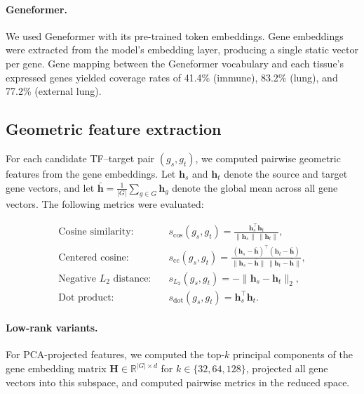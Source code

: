 \documentclass[11pt]{article}
\begin{document}
\paragraph{Geneformer.}
We used Geneformer \cite{theodoris2023transfer} with its pre-trained token embeddings.
Gene embeddings were extracted from the model's embedding layer, producing a single static vector per gene.
Gene mapping between the Geneformer vocabulary and each tissue's expressed genes yielded coverage rates of 41.4\% (immune), 83.2\% (lung), and 77.2\% (external lung).

\subsection*{Geometric feature extraction}

For each candidate TF--target pair $(g_s, g_t)$, we computed pairwise geometric features from the gene embeddings.
Let $\mathbf{h}_s$ and $\mathbf{h}_t$ denote the source and target gene vectors, and let $\bar{\mathbf{h}} = \frac{1}{|G|}\sum_{g \in G} \mathbf{h}_g$ denote the global mean across all gene vectors.
The following metrics were evaluated:

\begin{align}
\text{Cosine similarity:} \quad & s_{\cos}(g_s, g_t) = \frac{\mathbf{h}_s^\top \mathbf{h}_t}{\|\mathbf{h}_s\| \, \|\mathbf{h}_t\|}, \label{eq:cosine} \\[6pt]
\text{Centered cosine:} \quad & s_{\text{cc}}(g_s, g_t) = \frac{(\mathbf{h}_s - \bar{\mathbf{h}})^\top (\mathbf{h}_t - \bar{\mathbf{h}})}{\|\mathbf{h}_s - \bar{\mathbf{h}}\| \, \|\mathbf{h}_t - \bar{\mathbf{h}}\|}, \label{eq:centered_cosine} \\[6pt]
\text{Negative $L_2$ distance:} \quad & s_{L_2}(g_s, g_t) = -\|\mathbf{h}_s - \mathbf{h}_t\|_2, \label{eq:neg_l2} \\[6pt]
\text{Dot product:} \quad & s_{\text{dot}}(g_s, g_t) = \mathbf{h}_s^\top \mathbf{h}_t. \label{eq:dot}
\end{align}

\paragraph{Low-rank variants.}
For PCA-projected features, we computed the top-$k$ principal components of the gene embedding matrix $\mathbf{H} \in \mathbb{R}^{|G| \times d}$ for $k \in \{32, 64, 128\}$, projected all gene vectors into this subspace, and computed pairwise metrics in the reduced space.
\end{document}
